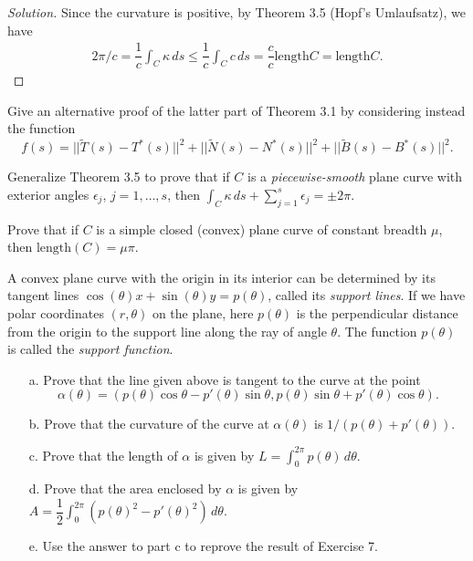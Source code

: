 \documentclass[Shifrin_Solutions_Spring_2018]{subfiles}
\begin{document}
\begin{proof}[Solution] Since the curvature is positive, by Theorem 3.5 (Hopf's Umlaufsatz), we have
\[
\begin{split}
2\pi/c = \dfrac{1}{c}\int_{C} \kappa \, ds \leq \dfrac{1}{c} \int_{C} c\, ds = \dfrac{c}{c}\mathrm{length}{C}=\mathrm{length}{C}.
\end{split}
\]
\end{proof}


\begin{exercise} Give an alternative proof of the latter part of Theorem 3.1 by considering instead the function
\[
f(s) = ||\tilde{T}(s) - T^*(s)||^2 + ||\tilde{N}(s) - N^*(s)||^2 + ||\tilde{B}(s) - B^*(s)||^2 .
\]
\end{exercise}

\begin{exercise} Generalize Theorem 3.5 to prove that if $C$ is a \emph{piecewise-smooth} plane curve with exterior angles $\epsilon_j$, $j=1,\ldots, s$, then $\int_{C} \kappa \, ds + \sum_{j=1}^s \epsilon_j = \pm 2\pi$.
\end{exercise}

\begin{exercise}
Prove that if $C$ is a simple closed (convex) plane curve of constant breadth $\mu$, then $\mathrm{length}(C) = \mu\pi$.
\end{exercise}

\begin{exercise} A convex plane curve with the origin in its interior can be determined by its tangent lines $\cos(\theta)x + \sin(\theta)y = p(\theta)$, called its \emph{support lines}. If we have polar coordinates $(r,\theta)$ on the plane, here $p(\theta)$ is the perpendicular distance from the origin to the support line along the ray of angle $\theta$. The function $p(\theta)$ is called the \emph{support function}.
\begin{itemize}
\item[a.] Prove that the line given above is tangent to the curve at the point
\[
\alpha(\theta) = \left( p(\theta) \cos\theta - p'(\theta) \sin \theta , p(\theta) \sin \theta + p'(\theta) \cos \theta \right) .
\]

\item[b.] Prove that the curvature of the curve at $\alpha(\theta)$ is $1/(p(\theta) + p'(\theta) )$.

\item[c.] Prove that the length of $\alpha$ is given by $L = \int_0^{2\pi} p(\theta) \, d\theta $.

\item[d.] Prove that the area enclosed by $\alpha$ is given by $A= \dfrac{1}{2} \int_0^{2\pi} (p(\theta)^2 - p'(\theta)^2 )\, d\theta$.

\item[e.] Use the answer to part c to reprove the result of Exercise 7.
\end{itemize}
\end{exercise}
\end{document}
